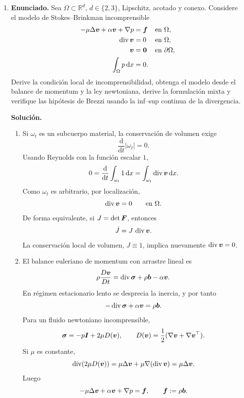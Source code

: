 \documentclass[11pt]{article}
\def\vec   #1{\mbox{\boldmath $#1$}{}}
\def\ten   #1{\mbox{\boldmath $#1$}{}}
\def\R{\mathbb R}
\def\dx{\mbox{\(\,\mathrm{d}x\)}}
\DeclareMathOperator{\dive}{div}
\begin{document}
\begin{enumerate}[label=\textbf{\arabic*.}, leftmargin=*]

    \item \textbf{Enunciado.} Sea $\Omega\subset\R^d$, $d\in\{2,3\}$, Lipschitz, acotado y conexo. Considere el modelo de Stokes--Brinkman incomprensible
    \[
    \begin{aligned}
        -\mu\Delta\vec v+\alpha\vec v+\nabla p&=\vec f &&\text{en }\Omega,\\
        \dive\vec v&=0 &&\text{en }\Omega,\\
        \vec v&=\vec0 &&\text{en }\partial\Omega,\\
        \int_\Omega p\dx&=0.
    \end{aligned}
    \]
    Derive la condición local de incomprensibilidad, obtenga el modelo desde el balance de momentum y la ley newtoniana, derive la formulación mixta y verifique las hipótesis de Brezzi usando la inf--sup continua de la divergencia.

    \textbf{Solución.}
    \begin{enumerate}[label=(\alph*)]
        \item Si $\omega_t$ es un subcuerpo material, la conservación de volumen exige
        \[
            \frac{\mathrm d}{\mathrm dt}|\omega_t|=0.
        \]
        Usando Reynolds con la función escalar $1$,
        \[
            0=\frac{\mathrm d}{\mathrm dt}\int_{\omega_t}1\dx
            =\int_{\omega_t}\dive\vec v\dx.
        \]
        Como $\omega_t$ es arbitrario, por localización,
        \[
            \dive\vec v=0\qquad\text{en }\Omega.
        \]
        De forma equivalente, si $J=\det\ten F$, entonces
        \[
            \dot J=J\,\dive\vec v.
        \]
        La conservación local de volumen, $J\equiv1$, implica nuevamente $\dive\vec v=0$.

        \item El balance euleriano de momentum con arrastre lineal es
        \[
            \rho\frac{D\vec v}{Dt}=\dive\ten\sigma+\rho\vec b-\alpha\vec v.
        \]
        En régimen estacionario lento se desprecia la inercia, y por tanto
        \[
            -\dive\ten\sigma+\alpha\vec v=\rho\vec b.
        \]
        Para un fluido newtoniano incomprensible,
        \[
            \ten\sigma=-p\ten I+2\mu D(\vec v),
            \qquad
            D(\vec v)=\frac12(\nabla\vec v+\nabla\vec v^\top).
        \]
        Si $\mu$ es constante,
        \[
            \dive(2\mu D(\vec v))
            =
            \mu\Delta\vec v+\mu\nabla(\dive\vec v)
            =
            \mu\Delta\vec v.
        \]
        Luego
        \[
            -\mu\Delta\vec v+\alpha\vec v+\nabla p=\vec f,
            \qquad
            \vec f:=\rho\vec b.
        \]


\end{enumerate}
\end{enumerate}
\end{document}
